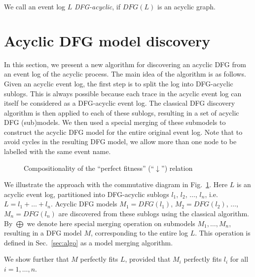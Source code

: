 \documentclass[11pt]{article}
\theoremstyle{definition}
\begin{document}
We call an event log $L$ \textit{DFG-acyclic}, if $DFG(L)$ is an acyclic graph.

\section{Acyclic DFG model discovery}\label{sec:discovery}


In this section, we present a new algorithm for discovering an acyclic DFG from an event log of the acyclic process. The main idea of the algorithm is as follows. 
Given an acyclic event log, the first step is to split the log into DFG-acyclic sublogs.
This is always possible because each trace in the acyclic event log can itself be considered as a DFG-acyclic event log.
The classical DFG discovery algorithm is then applied to each of these sublogs, resulting in a set of acyclic DFG (sub)models. 
We then used a special merging of these submodels to construct the acyclic DFG model for the entire original event log.
Note that to avoid cycles in the resulting DFG model, we allow more than one node to be labelled with the same event name.

\begin{figure}[htb]
    \centering
    \caption{Compositionality of the ``perfect fitness'' (``$\downarrow$'') relation}
    \label{fig:diagram}
\end{figure}

We illustrate the approach with the commutative diagram in Fig.~\ref{fig:diagram}. 
Here $L$ is an acyclic event log,
 partitioned into DFG-acyclic sublogs $l_1$, $l_2$, $\dots$, $l_n$, i.e.
$L = l_1 +  \dots + l_n$.
Acyclic DFG models $M_1 = DFG(l_1)$, $M_2 = DFG(l_2)$, $\dots$, $M_n = DFG(l_n)$ are discovered from these sublogs using the classical algorithm. By  $\bigoplus$ we denote here special merging operation on submodels $M_1,\dots,M_n$, resulting in a DFG model $M$, corresponding to the entire log $L$. This operation is defined in Sec.~\ref{sec:algo} as a model merging algorithm. 

We show further that $M$ perfectly fits $L$, provided that $M_i$ perfectly fits $l_i$ for all $i=1,\dots,n$.
\end{document}
